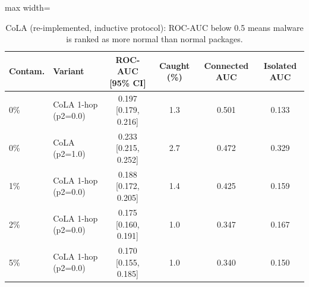 \begin{table}[htbp]
\centering
\small
\caption{CoLA (re-implemented, inductive protocol): ROC-AUC below 0.5 means malware is ranked as more normal than normal packages.}
\label{tab:cola}
\begin{adjustbox}{max width=\linewidth}
\begin{tabular}{llcccc}
\toprule
Contam. & Variant & ROC-AUC [95\% CI] & Caught (\%) & Connected AUC & Isolated AUC \\
\midrule
0\% & CoLA 1-hop (p2=0.0) & 0.197 [0.179, 0.216] & 1.3 & 0.501 & 0.133 \\
0\% & CoLA (p2=1.0) & 0.233 [0.215, 0.252] & 2.7 & 0.472 & 0.329 \\
1\% & CoLA 1-hop (p2=0.0) & 0.188 [0.172, 0.205] & 1.4 & 0.425 & 0.159 \\
2\% & CoLA 1-hop (p2=0.0) & 0.175 [0.160, 0.191] & 1.0 & 0.347 & 0.167 \\
5\% & CoLA 1-hop (p2=0.0) & 0.170 [0.155, 0.185] & 1.0 & 0.340 & 0.150 \\
\bottomrule
\end{tabular}
\end{adjustbox}
\end{table}
